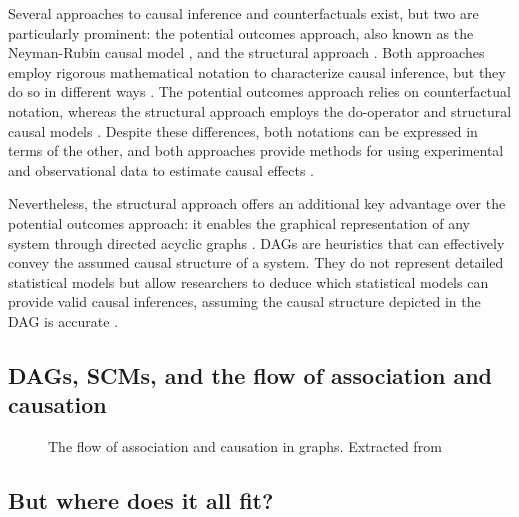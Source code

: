 \documentclass[
  authoryear,
  preprint,
  1p]{elsarticle}
\begin{document}
Several approaches to causal inference and counterfactuals exist, but
two are particularly prominent: the potential outcomes approach, also
known as the Neyman-Rubin causal model
\citep{Neyman_et_al_1923, Rubin_1974}, and the structural approach
\citep{Wright_1921, Pearl_2009, Pearl_et_al_2016}. Both approaches
employ rigorous mathematical notation to characterize causal inference,
but they do so in different ways \citep{Neal_2020}. The potential
outcomes approach relies on counterfactual notation, whereas the
structural approach employs the do-operator and structural causal models
\citep[SCM,][]{Pearl_2009, Pearl_et_al_2016}. Despite these differences,
both notations can be expressed in terms of the other, and both
approaches provide methods for using experimental and observational data
to estimate causal effects \citep{Pearl_2010}.

Nevertheless, the structural approach offers an additional key advantage
over the potential outcomes approach: it enables the graphical
representation of any system through directed acyclic graphs
\citep[DAG,][]{Gross_et_al_2018, Neal_2020}. DAGs are heuristics that
can effectively convey the assumed causal structure of a system. They do
not represent detailed statistical models but allow researchers to
deduce which statistical models can provide valid causal inferences,
assuming the causal structure depicted in the DAG is accurate
\citep{McElreath_2020}.

\subsection{DAGs, SCMs, and the flow of association and
causation}\label{sec-background-dag}

\begin{figure}


\caption{\label{fig-ACflow}The flow of association and causation in
graphs. Extracted from \citet[31]{Neal_2020}}

\end{figure}%

\subsection{But where does it all fit?}\label{sec-background-where}
\end{document}
